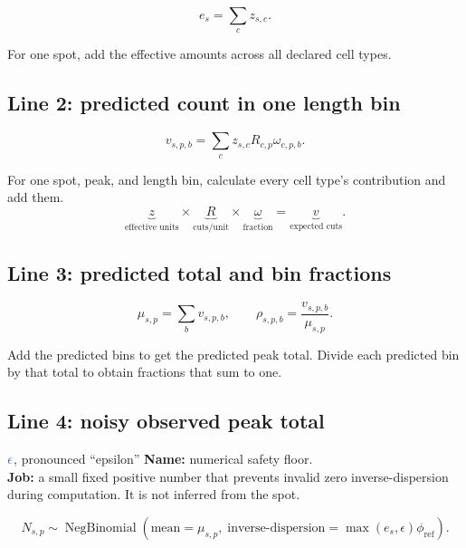 \documentclass[11pt]{article}
\newcommand{\NB}{\operatorname{NegBinomial}}
\newcommand{\fixedq}[1]{\textcolor{fixedblue!75!black}{#1}}
\begin{document}
\[
\boxed{e_s=\sum_cz_{s,c}.}
\]

\begin{translation}
For one spot, add the effective amounts across all declared cell types.
\end{translation}

\subsection{Line 2: predicted count in one length bin}

\[
\boxed{
v_{s,p,b}
=
\sum_cz_{s,c}R_{c,p}\omega_{c,p,b}.
}
\]

\begin{translation}
For one spot, peak, and length bin, calculate every cell type's contribution and
add them.
\[
\underbrace{z}_{\text{effective units}}
\times
\underbrace{R}_{\text{cuts/unit}}
\times
\underbrace{\omega}_{\text{fraction}}
=
\underbrace{v}_{\text{expected cuts}}.
\]
\end{translation}

\subsection{Line 3: predicted total and bin fractions}

\[
\boxed{
\mu_{s,p}=\sum_bv_{s,p,b},
\qquad
\rho_{s,p,b}=\frac{v_{s,p,b}}{\mu_{s,p}}.
}
\]

\begin{translation}
Add the predicted bins to get the predicted peak total. Divide each predicted bin
by that total to obtain fractions that sum to one.
\end{translation}

\subsection{Line 4: noisy observed peak total}

\begin{newvar}{\(\fixedq{\epsilon}\), pronounced “epsilon”}
\textbf{Name:} numerical safety floor.\\
\textbf{Job:} a small fixed positive number that prevents invalid zero
inverse-dispersion during computation. It is not inferred from the spot.
\end{newvar}

\[
\boxed{
N_{s,p}
\sim
\NB\!\left(
\text{mean}=\mu_{s,p},\;
\text{inverse-dispersion}
=\max(e_s,\epsilon)\phi_{\mathrm{ref}}
\right).
}
\]
\end{document}
